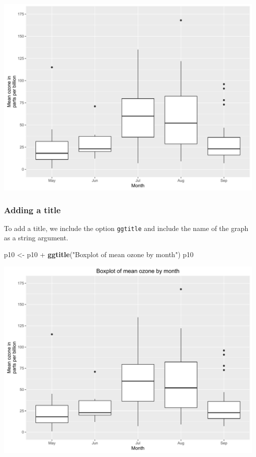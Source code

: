 \documentclass[]{article}
\newenvironment{Shaded}{\begin{snugshade}}{\end{snugshade}}
\newcommand{\KeywordTok}[1]{\textcolor[rgb]{0.13,0.29,0.53}{\textbf{{#1}}}}
\newcommand{\StringTok}[1]{\textcolor[rgb]{0.31,0.60,0.02}{{#1}}}
\newcommand{\NormalTok}[1]{{#1}}
\begin{document}
\begin{center}\includegraphics{0_all_posts_pdf/box_4-1} \end{center}

\subsubsection{Adding a title}\label{adding-a-title-3}

To add a title, we include the option \texttt{ggtitle} and include the
name of the graph as a string argument.

\begin{Shaded}
\begin{Highlighting}[]
\NormalTok{p10 <-}\StringTok{ }\NormalTok{p10 +}\StringTok{ }\KeywordTok{ggtitle}\NormalTok{(}\StringTok{"Boxplot of mean ozone by month"}\NormalTok{)}
\NormalTok{p10}
\end{Highlighting}
\end{Shaded}

\begin{center}\includegraphics{0_all_posts_pdf/box_5-1} \end{center}
\end{document}
